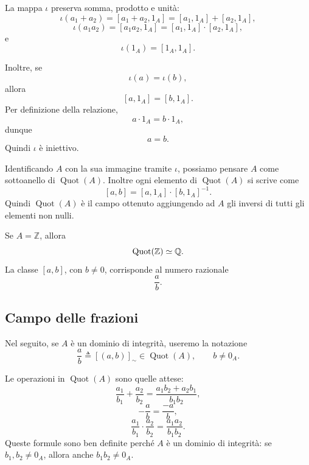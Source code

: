 \documentclass[a4paper]{article}
\begin{document}
\begin{radioactive}
\begin{snippetproof}{}
    La mappa \(\iota\) preserva somma, prodotto e unità:
    \[
        \iota(a_1+a_2)
        =
        [a_1+a_2,1_A]
        =
        [a_1,1_A]+[a_2,1_A],
    \]
    \[
        \iota(a_1a_2)
        =
        [a_1a_2,1_A]
        =
        [a_1,1_A]\cdot [a_2,1_A],
    \]
    e
    \[
        \iota(1_A)=[1_A,1_A].
    \]

    Inoltre, se
    \[
        \iota(a)=\iota(b),
    \]
    allora
    \[
        [a,1_A]=[b,1_A].
    \]
    Per definizione della relazione,
    \[
        a\cdot 1_A=b\cdot 1_A,
    \]
    dunque
    \[
        a=b.
    \]
    Quindi \(\iota\) è iniettivo.
\end{snippetproof}
\end{radioactive}

\begin{radioactive}
Identificando \(A\) con la sua immagine tramite \(\iota\), possiamo pensare \(A\) come sottoanello di \(\operatorname{Quot}(A)\). Inoltre ogni elemento di \(\operatorname{Quot}(A)\) si scrive come
\[
    [a,b]=[a,1_A]\cdot [b,1_A]^{-1}.
\]
Quindi \(\operatorname{Quot}(A)\) è il campo ottenuto aggiungendo ad \(A\) gli inversi di tutti gli elementi non nulli.
\end{radioactive}

\begin{radioactive}
\begin{snippetexample}{}
    Se \(A=\mathbb{Z}\), allora
    \[
        \operatorname{Quot}(\mathbb{Z})\simeq \mathbb{Q}.
    \]
    La classe \([a,b]\), con \(b\neq 0\), corrisponde al numero razionale
    \[
        \frac{a}{b}.
    \]
\end{snippetexample}
\end{radioactive}

\pagebreak

\subsection{Campo delle frazioni}

\begin{radioactive}
Nel seguito, se \(A\) è un dominio di integrità, useremo la notazione
\[
    \frac{a}{b}
    \triangleq
    [(a,b)]_{\sim}
    \in \operatorname{Quot}(A),
    \qquad
    b\neq 0_A.
\]
\end{radioactive}

\begin{radioactive}
Le operazioni in \(\operatorname{Quot}(A)\) sono quelle attese:
\[
    \frac{a_1}{b_1}+\frac{a_2}{b_2}
    =
    \frac{a_1b_2+a_2b_1}{b_1b_2},
\]
\[
    -\frac{a}{b}
    =
    \frac{-a}{b},
\]
\[
    \frac{a_1}{b_1}\cdot\frac{a_2}{b_2}
    =
    \frac{a_1a_2}{b_1b_2}.
\]
Queste formule sono ben definite perché \(A\) è un dominio di integrità: se \(b_1,b_2\neq 0_A\), allora anche \(b_1b_2\neq 0_A\).
\end{radioactive}
\end{document}
